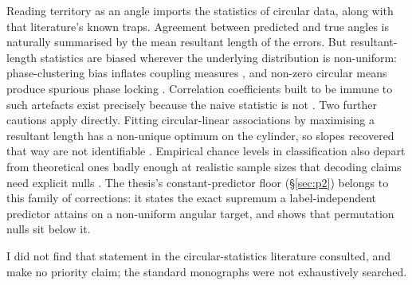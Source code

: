 Reading territory as an angle imports the statistics of circular data, along with that literature's known traps. Agreement between predicted and true angles is naturally summarised by the mean resultant length of the errors. But resultant-length statistics are biased wherever the underlying distribution is non-uniform: phase-clustering bias inflates coupling measures \citep{vandriel2015phase}, and non-zero circular means produce spurious phase locking \citep{kovach2017biased}. Correlation coefficients built to be immune to such artefacts exist precisely because the naive statistic is not \citep{fisherlee1983correlation,jammalamadaka1988correlation}. Two further cautions apply directly. Fitting circular-linear associations by maximising a resultant length has a non-unique optimum on the cylinder, so slopes recovered that way are not identifiable \citep{kempter2012quantifying}. Empirical chance levels in classification also depart from theoretical ones badly enough at realistic sample sizes that decoding claims need explicit nulls \citep{combrisson2015exceeding}. The thesis's constant-predictor floor (\S\ref{sec:p2}) belongs to this family of corrections: it states the exact supremum a label-independent predictor attains on a non-uniform angular target, and shows that permutation nulls sit below it.

I did not find that statement in the circular-statistics literature consulted, and make no priority claim; the standard monographs were not exhaustively searched. 
